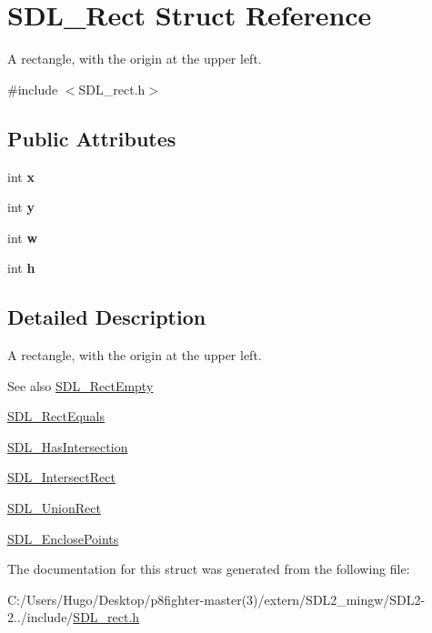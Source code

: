 \hypertarget{struct_s_d_l___rect}{}\section{S\+D\+L\+\_\+\+Rect Struct Reference}
\label{struct_s_d_l___rect}


A rectangle, with the origin at the upper left.  




{\ttfamily \#include $<$S\+D\+L\+\_\+rect.\+h$>$}

\subsection*{Public Attributes}
\begin{DoxyCompactItemize}
\item 
\mbox{\label{struct_s_d_l___rect_a85418d94621dd6855805c4b5c7bf6482}} 
int {\bfseries x}
\item 
\mbox{\label{struct_s_d_l___rect_a822694af8ddca5fd0d5d94e47106ab85}} 
int {\bfseries y}
\item 
\mbox{\label{struct_s_d_l___rect_a56b7be5738fb6fab86881534a814c45e}} 
int {\bfseries w}
\item 
\mbox{\label{struct_s_d_l___rect_a0a17d46b320af8063b746153348edd72}} 
int {\bfseries h}
\end{DoxyCompactItemize}


\subsection{Detailed Description}
A rectangle, with the origin at the upper left. 

\begin{DoxySeeAlso}{See also}
\hyperlink{_s_d_l__rect_8h_aac0e9b5d3f34baec6a2cde95bb01f49c}{S\+D\+L\+\_\+\+Rect\+Empty} 

\hyperlink{_s_d_l__rect_8h_a156979fd3561cf90b87741d11057262a}{S\+D\+L\+\_\+\+Rect\+Equals} 

\hyperlink{_s_d_l__rect_8h_a191ec0b069421d4a36304b475697e847}{S\+D\+L\+\_\+\+Has\+Intersection} 

\hyperlink{_s_d_l__rect_8h_aff8e3dd3b1a25443cd7c8cf02a087290}{S\+D\+L\+\_\+\+Intersect\+Rect} 

\hyperlink{_s_d_l__rect_8h_a659f2c25335202888408c95195823f9c}{S\+D\+L\+\_\+\+Union\+Rect} 

\hyperlink{_s_d_l__rect_8h_afcbb58dbba760b9e6fdb4b5d1ece015c}{S\+D\+L\+\_\+\+Enclose\+Points} 
\end{DoxySeeAlso}


The documentation for this struct was generated from the following file\+:\begin{DoxyCompactItemize}
\item 
C\+:/\+Users/\+Hugo/\+Desktop/p8fighter-\/master(3)/extern/\+S\+D\+L2\+\_\+mingw/\+S\+D\+L2-\/2../include/\hyperlink{_s_d_l__rect_8h}{S\+D\+L\+\_\+rect.\+h}\end{DoxyCompactItemize}
